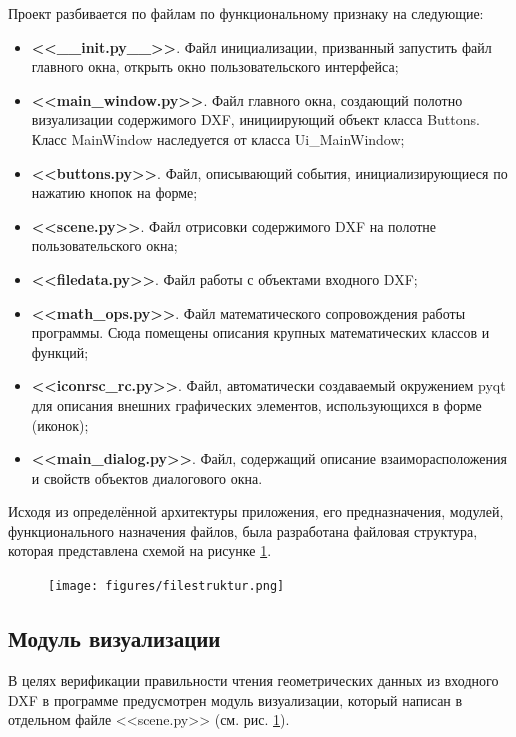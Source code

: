 Проект разбивается по файлам по функциональному признаку на следующие:
\begin{itemize}
	\item \textbf{<<\_\_init.py\_\_>>}. Файл инициализации, призванный запустить файл главного окна, открыть окно пользовательского интерфейса;
	\item \textbf{<<main\_window.py>>}. Файл главного окна, создающий полотно визуализации содержимого DXF, инициирующий объект класса Buttons. Класс MainWindow наследуется от класса Ui\_MainWindow;
	\item \textbf{<<buttons.py>>}. Файл, описывающий события, инициализирующиеся по нажатию кнопок на форме; 
	\item \textbf{<<scene.py>>}. Файл отрисовки содержимого DXF на полотне пользовательского окна;
	\item \textbf{<<filedata.py>>}. Файл работы с объектами входного DXF; 
	\item \textbf{<<math\_ops.py>>}. Файл математического сопровождения работы программы. Сюда помещены описания крупных математических классов и функций;
	\item \textbf{<<iconrsc\_rc.py>>}. Файл, автоматически создаваемый окружением pyqt для описания внешних графических элементов, использующихся в форме (иконок);
	\item \textbf{<<main\_dialog.py>>}. Файл, содержащий описание взаиморасположения и свойств объектов диалогового окна.
\end{itemize}


Исходя из определённой архитектуры приложения, его предназначения, модулей, функционального назначения файлов, была разработана файловая структура, которая представлена схемой на рисунке \ref{fig:filestruktur}.

\begin{figure}[H]
	\centering
	\texttt{[image: figures/filestruktur.png]}
	\label{fig:filestruktur}
\end{figure}

\subsection{Модуль визуализации}

В целях верификации правильности чтения геометрических данных из входного DXF в программе предусмотрен модуль визуализации, который написан в отдельном файле <<scene.py>> (см. рис. \ref{fig:filestruktur}).

